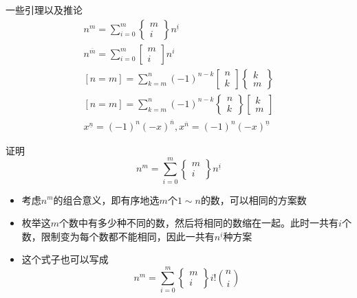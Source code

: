 \documentclass{beamer}
\begin{document}
\begin{frame}{一些引理以及推论}
    $$\begin{gathered}
        n^m = \sum_{i = 0}^m \begin{Bmatrix}m\\ i\end{Bmatrix}n^{\underline{i}}\\
        n^{\overline{m}} = \sum_{i = 0}^m \begin{bmatrix}m\\ i\end{bmatrix}n^i\\
        [n = m] = \sum_{k = m}^n(-1)^{n - k}\begin{bmatrix}n\\ k\end{bmatrix}\begin{Bmatrix}k\\ m\end{Bmatrix}\\
        [n = m] = \sum_{k = m}^n(-1)^{n - k}\begin{Bmatrix}n\\ k\end{Bmatrix}\begin{bmatrix}k\\ m\end{bmatrix}\\
        x^{\underline{n}} = (-1)^n (-x)^{\overline{n}} , x^{\overline{n}} = (-1)^n (-x)^{\underline{n}}
    \end{gathered}$$
\end{frame}

\begin{frame}{证明}
    $$n^m = \sum_{i = 0}^m \begin{Bmatrix}m\\ i\end{Bmatrix}n^{\underline{i}}$$ \pause
    \begin{itemize}
        \item 考虑$n^m$的组合意义，即有序地选$m$个$1\sim n$的数，可以相同的方案数 \pause
        \item 枚举这$m$个数中有多少种不同的数，然后将相同的数缩在一起。此时一共有$i$个数，限制变为每个数都不能相同，因此一共有$n^{\underline{i}}$种方案 \pause
        \item 这个式子也可以写成
        $$n^m = \sum_{i = 0}^m \begin{Bmatrix}m\\ i\end{Bmatrix}i!{n\choose i}$$
    \end{itemize}
\end{frame}
\end{document}
